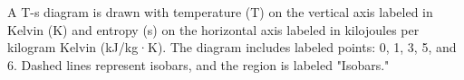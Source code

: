 A T-s diagram is drawn with temperature (T) on the vertical axis labeled in Kelvin (K) and entropy (s) on the horizontal axis labeled in kilojoules per kilogram Kelvin (kJ/kg·K). The diagram includes labeled points: 0, 1, 3, 5, and 6. Dashed lines represent isobars, and the region is labeled "Isobars."